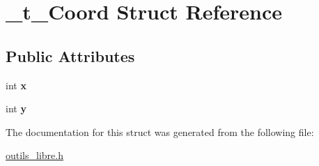 \hypertarget{struct__t__Coord}{\section{\-\_\-t\-\_\-\-Coord Struct Reference}
\label{struct__t__Coord}
}
\subsection*{Public Attributes}
\begin{DoxyCompactItemize}
\item 
\hypertarget{struct__t__Coord_a593a81026d9ad7bec726736ce32c5660}{int {\bfseries x}}\label{struct__t__Coord_a593a81026d9ad7bec726736ce32c5660}

\item 
\hypertarget{struct__t__Coord_ae4e218fd7b05406f283e6dbbccffff35}{int {\bfseries y}}\label{struct__t__Coord_ae4e218fd7b05406f283e6dbbccffff35}

\end{DoxyCompactItemize}


The documentation for this struct was generated from the following file\-:\begin{DoxyCompactItemize}
\item 
\hyperlink{outils__libre_8h}{outils\-\_\-libre.\-h}\end{DoxyCompactItemize}
